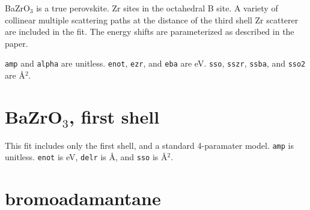 \documentclass{article}
\let\stdsection\section
\renewcommand\section{\newpage\stdsection}
\begin{document}
BaZrO$_3$ is a true perovskite.  Zr sites in the octahedral B site.  A
variety of collinear multiple scattering paths at the distance of the
third shell Zr scatterer are included in the fit.  The energy shifts
are parameterized as described in the paper.

\texttt{amp} and \texttt{alpha} are unitless.  \texttt{enot},
\texttt{ezr}, and \texttt{eba} are eV.  \texttt{sso}, \texttt{sszr},
\texttt{ssba}, and \texttt{sso2} are \AA$^2$.


\renewcommand{\feffmaterial}{BaZrO3}
\renewcommand{\feffrone}{3}
\renewcommand{\feffrtwo}{4}
\renewcommand{\feffrthree}{5}
\renewcommand{\feffrfour}{5.5}
\renewcommand{\feffrfive}{6}
\renewcommand{\fefffirst}{}

\scriptsize

\fitplots


\section{BaZrO$_3$, first shell}
\normalsize
This fit includes only the first shell, and a standard 4-paramater
model.  \texttt{amp} is unitless.  \texttt{enot} is eV, \texttt{delr}
is \AA, and \texttt{sso} is \AA$^2$.

\renewcommand{\fefffirst}{_1st}

\small

\fitplots




% 





\section{bromoadamantane}
\normalsize
\end{document}
